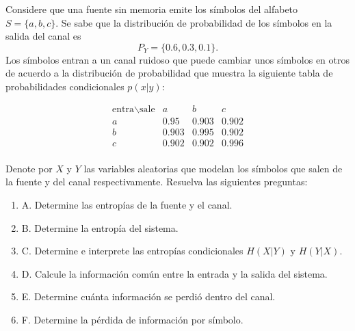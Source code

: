 Considere que una fuente sin memoria emite los símbolos del alfabeto $S = \{a, b, c\}$. Se sabe que la distribución de probabilidad de los símbolos en la salida del canal es 
\[
P_Y = \{0\text{.}6, 0\text{.}3, 0\text{.}1\}.
\]
Los símbolos entran a un canal ruidoso que puede cambiar unos símbolos en otros de acuerdo a la distribución de probabilidad que muestra la siguiente tabla de probabilidades condicionales $p(x|y)$:

\[
\begin{array}{c|ccc}
\text{entra} \backslash \text{sale} & a & b & c \\
\hline
a & 0\text{.}95 & 0\text{.}903 & 0\text{.}902 \\
b & 0\text{.}903 & 0\text{.}995 & 0\text{.}902 \\
c & 0\text{.}902 & 0\text{.}902 & 0\text{.}996 \\
\end{array}
\]

Denote por $X$ y $Y$ las variables aleatorias que modelan los símbolos que salen de la fuente y del canal respectivamente. Resuelva las siguientes preguntas:

\begin{enumerate}
    \item A. Determine las entropías de la fuente y el canal.
    \item B. Determine la entropía del sistema.
    \item C. Determine e interprete las entropías condicionales $H(X|Y)$ y $H(Y|X)$.
    \item D. Calcule la información común entre la entrada y la salida del sistema.
    \item E. Determine cuánta información se perdió dentro del canal.
    \item F. Determine la pérdida de información por símbolo.
\end{enumerate}


